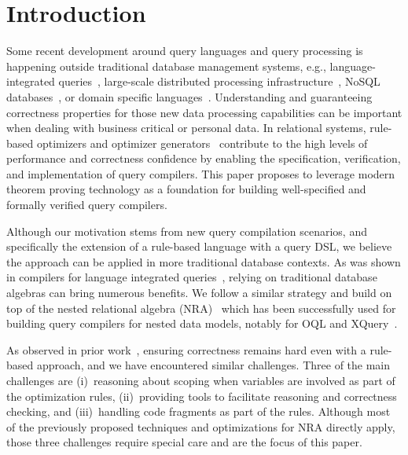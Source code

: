 \section{Introduction}
\label{sec:introduction}

Some recent development around query languages and query processing is
happening outside traditional database management systems, e.g.,
language-integrated queries~\cite{cooper2007links,Meijer11},
large-scale distributed processing
infrastructure~\cite{armbrust2015spark,BeyerEGBEKOS11-full,OlstonRSKT08},
NoSQL databases~\cite{OngPV14}, or domain specific
languages~\cite{ShinnarSH15}. Understanding and guaranteeing
correctness properties for those new data processing capabilities can
be important when dealing with business critical or personal data. In
relational systems, rule-based optimizers and optimizer
generators~\cite{CareyDFGRSM91,cherniack1996rule,CherniackZ98,FegarasMS93,LeungMSVVZ93,PiraheshHH92}
contribute to the high levels of performance and correctness
confidence by enabling the specification, verification, and
implementation of query compilers. This paper proposes to leverage
modern theorem proving technology as a foundation for building
well-specified and formally verified query compilers.

Although our motivation stems from new query compilation scenarios,
and specifically the extension of a rule-based language with a query
DSL, we believe the approach can be applied in more traditional
database contexts. As was shown in compilers for language integrated
queries~\cite{grust2009ferry}, relying on traditional database
algebras can bring numerous benefits. We follow a similar strategy and
build on top of the nested relational algebra
(NRA)~\cite{CluetM93,fegaras2000optimizing} which has been
successfully used for building query compilers for nested data models,
notably for OQL and XQuery~\cite{MayHM04,re2006complete}.

As observed in prior work~\cite{cherniack1996rule,CherniackZ98},
ensuring correctness remains hard even with a rule-based approach, and
we have encountered similar challenges. Three of the main challenges
are (i)~reasoning about scoping when variables are involved as part of
the optimization rules, (ii)~providing tools to facilitate reasoning
and correctness checking, and (iii)~handling code fragments as part of
the rules. Although most of the previously proposed techniques and
optimizations for NRA directly apply, those three challenges require
special care and are the focus of this paper.

